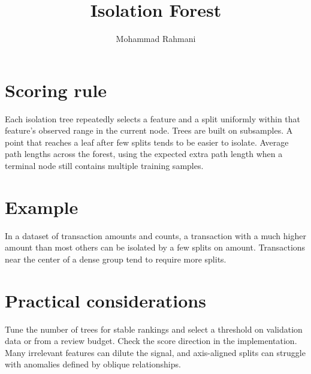 \documentclass[a4paper]{article}
\title{Isolation Forest}
\date{}
\author{Mohammad Rahmani}
\begin{document}
   \maketitle

\section{Scoring rule}
Each isolation tree repeatedly selects a feature and a split uniformly within that feature's observed range in the current node. Trees are built on subsamples. A point that reaches a leaf after few splits tends to be easier to isolate. Average path lengths across the forest, using the expected extra path length when a terminal node still contains multiple training samples.

\section{Example}
In a dataset of transaction amounts and counts, a transaction with a much higher amount than most others can be isolated by a few splits on amount. Transactions near the center of a dense group tend to require more splits.

\section{Practical considerations}
Tune the number of trees for stable rankings and select a threshold on validation data or from a review budget. Check the score direction in the implementation. Many irrelevant features can dilute the signal, and axis-aligned splits can struggle with anomalies defined by oblique relationships.



   
   
\end{document}
